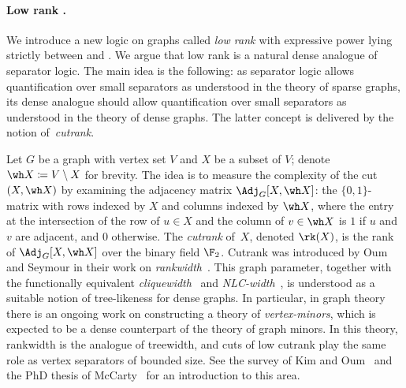 \vspace{-0.1cm}
\paragraph*{Low rank \mso.} We introduce a new logic on graphs called {\em{low rank \mso}} with expressive power lying strictly between \fo and \mso. We argue that low rank \mso is a natural dense analogue of separator logic. The main idea is the following: as separator logic allows quantification over small separators as understood in the theory of sparse graphs, its dense analogue should allow quantification over small separators as understood in the theory of dense graphs. The latter concept is delivered by the notion of~{\em{cutrank}}.

Let $G$ be a graph with vertex set $V$ and $X$ be a subset of $V$; denote $\wh X\coloneqq V\setminus X$ for brevity. The idea is to measure the complexity of the cut $(X,\wh X)$ by examining the adjacency matrix $\Adj_G[X,\wh X]$: the $\{0,1\}$-matrix with rows indexed by $X$ and columns indexed by $\wh X$, where the entry at the intersection of the row of $u\in X$ and the column of $v\in \wh X$ is $1$ if $u$ and $v$ are adjacent, and $0$ otherwise. The {\em{cutrank}} of~$X$, denoted $\rk(X)$, is the rank of $\Adj_G[X,\wh X]$ over the binary field $\F_2$. Cutrank was introduced by Oum and Seymour in their work on {\em{rankwidth}}~\cite{oum2005rank,OumS06}. This graph parameter, together with the functionally equivalent {\em{cliquewidth}}~\cite{courcelle2000linear} and {\em{NLC-width}}~\cite{Wanke94}, is understood as a suitable notion of tree-likeness for dense graphs. In particular, in graph theory there is an ongoing work on constructing a theory of {\em{vertex-minors}}, which is expected to be a dense counterpart of the theory of graph minors. In this theory, rankwidth is the analogue of treewidth, and cuts of low cutrank play the same role as vertex separators of bounded size. See the survey of Kim and Oum~\cite{KimO24} and the PhD thesis of McCarty~\cite{RoseThesis} for an introduction to this area.


